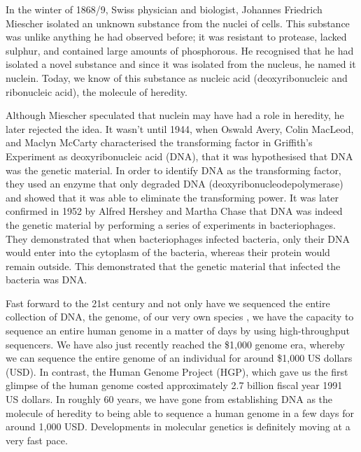 In the winter of 1868/9, Swiss physician and biologist, Johannes Friedrich Miescher isolated an unknown substance from the nuclei of cells\cite{dahm2008discovering}. This substance was unlike anything he had observed before; it was resistant to protease, lacked sulphur, and contained large amounts of phosphorous. He recognised that he had isolated a novel substance and since it was isolated from the nucleus, he named it nuclein. Today, we know of this substance as nucleic acid (deoxyribonucleic and ribonucleic acid), the molecule of heredity.

Although Miescher speculated that nuclein may have had a role in heredity, he later rejected the idea. It wasn't until 1944, when Oswald Avery, Colin MacLeod, and Maclyn McCarty characterised the transforming factor in Griffith's Experiment\cite{griffith1928significance} as deoxyribonucleic acid (DNA), that it was hypothesised that DNA was the genetic material\cite{avery1944studies}. In order to identify DNA as the transforming factor, they used an enzyme that only degraded DNA (deoxyribonucleodepolymerase) and showed that it was able to eliminate the transforming power. It was later confirmed in 1952 by Alfred Hershey and Martha Chase that DNA was indeed the genetic material by performing a series of experiments in bacteriophages\cite{hershey1952independent}. They demonstrated that when bacteriophages infected bacteria, only their DNA would enter into the cytoplasm of the bacteria, whereas their protein would remain outside. This demonstrated that the genetic material that infected the bacteria was DNA.

Fast forward to the 21st century and not only have we sequenced the entire collection of DNA, the genome, of our very own species \cite{venter2001sequence, lander2001initial}, we have the capacity to sequence an entire human genome in a matter of days by using high-throughput sequencers. We have also just recently reached the \$1,000 genome era, whereby we can sequence the entire genome of an individual for around \$1,000 US dollars (USD). In contrast, the Human Genome Project (HGP), which gave us the first glimpse of the human genome costed approximately 2.7 billion fiscal year 1991 US dollars\cite{nhgri2010cost}. In roughly 60 years, we have gone from establishing DNA as the molecule of heredity to being able to sequence a human genome in a few days for around 1,000 USD. Developments in molecular genetics is definitely moving at a very fast pace.

